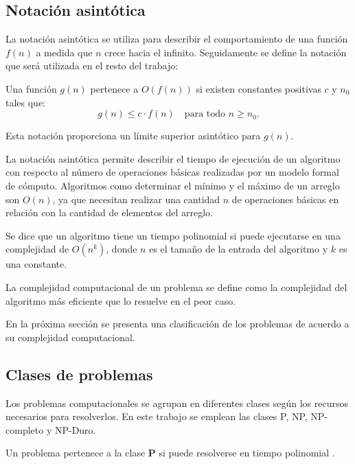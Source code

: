 \subsection{Notación asintótica}

La notación asintótica se utiliza para describir el comportamiento de una función $f(n)$ a medida que $n$ crece hacia el infinito.  Seguidamente se define la notación que será utilizada en el resto del trabajo:

\begin{definition}
  Una función $g(n)$ pertenece a $O(f(n))$ si existen constantes positivas $c$ y $n_0$ tales que:
  \[
    g(n) \leq c \cdot f(n) \quad \text{para todo } n \geq n_0.
  \]
\end{definition}

Esta notación proporciona un límite superior asintótico para $g(n)$.

La notación asintótica permite describir el tiempo de ejecución de un algoritmo con respecto al número de 
operaciones básicas realizadas por un modelo formal de cómputo.  Algoritmos como determinar el mínimo y el 
máximo de un arreglo son $O(n)$, ya que necesitan realizar una cantidad $n$ de operaciones básicas en relación
con la cantidad de elementos del arreglo.

Se dice que un algoritmo tiene un tiempo polinomial si puede ejecutarse en una complejidad de $O(n^k)$, donde $n$ es el tamaño de la entrada del algoritmo y $k$
es una constante.

La complejidad computacional de un problema se define como la complejidad del algoritmo más eficiente que lo resuelve en el peor caso.


En la próxima sección se presenta una clasificación de los problemas de acuerdo a su complejidad computacional.
\subsection{Clases de problemas}
\label{sec:problemsCategory}

Los problemas computacionales \cite{authomataTheory} se agrupan en diferentes clases según los recursos 
necesarios para resolverlos. En este trabajo se emplean las clases P, NP, NP-completo y NP-Duro.

\begin{definition}
  Un problema pertenece a la clase \textbf{P} si puede resolverse en tiempo polinomial \cite{authomataTheory}.
\end{definition}

